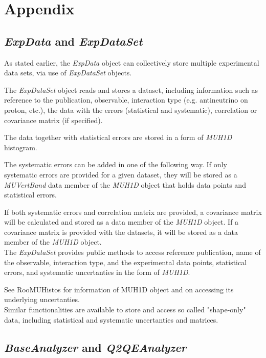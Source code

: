 \section{Appendix}

\subsection{ {\it ExpData} and {\it ExpDataSet} }

As stated earlier, the {\it ExpData} object can collectively store multiple experimental data sets,
via use of {\it ExpDataSet} objects.
 
The {\it ExpDataSet} object reads and stores a dataset, including information such 
as reference to the publication, observable, interaction type (e.g. antineutrino on proton, etc.), 
the data with the errors (statistical and systematic), correlation or covariance matrix (if specified). 

The data together with statistical errors are stored in a form of {\it MUH1D }histogram.

The systematic errors can be added in one of the following way. If only systematic errors are provided for 
a given dataset, they will be stored as a {\it MUVertBand} data member of the {\it MUH1D } object that holds 
data points and statistical errors. 

If both systematic errors and correlation matrix are provided, a covariance 
matrix will be calculated and stored as a data member of the {\it MUH1D } object. If a covariance matrix is 
provided with the datasets, it will be stored as a data member of the {\it MUH1D} object. \\

The {\it ExpDataSet} provides public methods to access reference publication, name of the observable, interaction
type, and the experimental data points, statistical errors, and systematic uncertanties in the form of { \it MUH1D}.

See RooMUHistos\cite{roomuhistos} for information of MUH1D object and on accessing its underlying uncertanties.\\
Similar functionalities are available to store and access so called "shape-only" data, including statistical and
systematic uncertanties and matrices. 

\subsection{ {\it BaseAnalyzer} and {\it Q2QEAnalyzer} }

